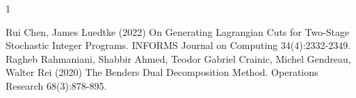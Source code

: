 \documentclass[11pt]{article}
\begin{document}
\begin{thebibliography}{1}


Rui Chen, James Luedtke (2022) On Generating Lagrangian Cuts for Two-Stage Stochastic Integer Programs. INFORMS Journal on Computing 34(4):2332-2349.
Ragheb Rahmaniani, Shabbir Ahmed, Teodor Gabriel Crainic, Michel Gendreau, Walter Rei (2020) The Benders Dual Decomposition Method. Operations Research 68(3):878-895.

\end{thebibliography}
\end{document}
